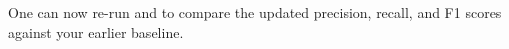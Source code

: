 One can now re-run  and\linebreak[4]  to compare the updated precision, recall, and F1 scores against your earlier baseline.

